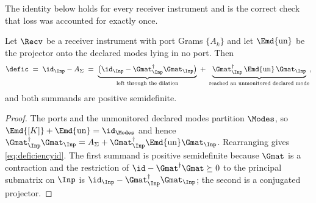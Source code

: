 
The identity below holds for every receiver instrument and is the correct
check that loss was accounted for exactly once.

\begin{lemma}\label{lem:deficiency}
Let $\Recv$ be a receiver instrument with port Grams $\{A_k\}$ and let
$\Emd{\mathrm{un}}$ be the projector onto the declared modes lying in no
port. Then
\begin{equation}\label{eq:deficiencyid}
  \defic\;=\;\id_{\Inp}-A_\Sigma
  \;=\;\underbrace{\big(\id_{\Inp}
    -\Gmat_{\Inp}^\dagger\Gmat_{\Inp}\big)}_{\text{left through the
    dilation}}
  \;+\;\underbrace{\Gmat_{\Inp}^\dagger\,\Emd{\mathrm{un}}\,
    \Gmat_{\Inp}}_{\text{reached an unmonitored declared mode}} ,
\end{equation}
and both summands are positive semidefinite.
\end{lemma}

\begin{proof}
The ports and the unmonitored declared modes partition $\Modes$, so
$\Emd{[K]}+\Emd{\mathrm{un}}=\id_{\Modes}$ and hence
$\Gmat_{\Inp}^\dagger\Gmat_{\Inp}=A_\Sigma+\Gmat_{\Inp}^\dagger
\Emd{\mathrm{un}}\Gmat_{\Inp}$. Rearranging gives \eqref{eq:deficiencyid}. The
first summand is positive semidefinite because $\Gmat$ is a contraction and the
restriction of $\id-\Gmat^\dagger\Gmat\succeq0$ to the principal submatrix on
$\Inp$ is $\id_{\Inp}-\Gmat_{\Inp}^\dagger\Gmat_{\Inp}$; the second is a
conjugated projector.
\end{proof}
